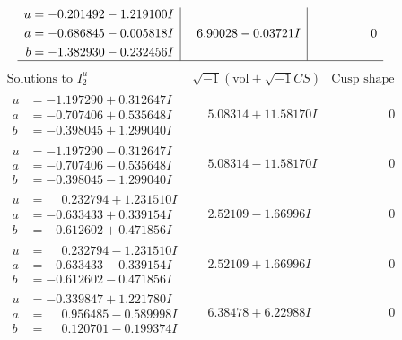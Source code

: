 \documentclass[1p]{elsarticle_modified}
\theoremstyle{definition}
\newcommand{\I}{\sqrt{-1}}
\begin{document}
$$\begin{array}{c|c|c}
\begin{aligned}
u &= -0.201492 - 1.219100 I \\
a &= -0.686845 - 0.005818 I \\
b &= -1.382930 - 0.232456 I\end{aligned}
 & \phantom{-}6.90028 - 0.03721 I & \phantom{-0.000000 } 0\\
 \hline 
 \end{array}$$\newpage$$\begin{array}{c|c|c}  
\text{Solutions to }I^u_{2}& \I (\text{vol} + \sqrt{-1}CS) & \text{Cusp shape}\\
 \hline 
\begin{aligned}
u &= -1.197290 + 0.312647 I \\
a &= -0.707406 + 0.535648 I \\
b &= -0.398045 + 1.299040 I\end{aligned}
 & \phantom{-}5.08314 + 11.58170 I & \phantom{-0.000000 } 0 \\ \hline\begin{aligned}
u &= -1.197290 - 0.312647 I \\
a &= -0.707406 - 0.535648 I \\
b &= -0.398045 - 1.299040 I\end{aligned}
 & \phantom{-}5.08314 - 11.58170 I & \phantom{-0.000000 } 0 \\ \hline\begin{aligned}
u &= \phantom{-}0.232794 + 1.231510 I \\
a &= -0.633433 + 0.339154 I \\
b &= -0.612602 + 0.471856 I\end{aligned}
 & \phantom{-}2.52109 - 1.66996 I & \phantom{-0.000000 } 0 \\ \hline\begin{aligned}
u &= \phantom{-}0.232794 - 1.231510 I \\
a &= -0.633433 - 0.339154 I \\
b &= -0.612602 - 0.471856 I\end{aligned}
 & \phantom{-}2.52109 + 1.66996 I & \phantom{-0.000000 } 0 \\ \hline\begin{aligned}
u &= -0.339847 + 1.221780 I \\
a &= \phantom{-}0.956485 - 0.589998 I \\
b &= \phantom{-}0.120701 - 0.199374 I\end{aligned}
 & \phantom{-}6.38478 + 6.22988 I & \phantom{-0.000000 } 0 \\ \hline\begin{aligned}

\end{aligned}
\end{array}$$
\end{document}
